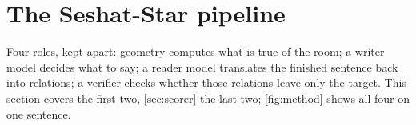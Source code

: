 \section{The Seshat-Star pipeline}
\label{sec:pipeline}

Four roles, kept apart: geometry computes what is true of the room; a writer model decides what to say; a reader model translates the finished sentence back into relations; a verifier checks whether those relations leave only the target.
This section covers the first two, \cref{sec:scorer} the last two; \cref{fig:method} shows all four on one sentence.


